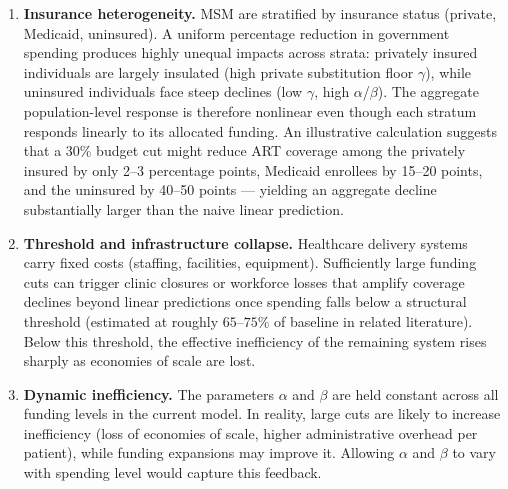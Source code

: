 \documentclass[preprint,12pt]{elsarticle}
\begin{document}
{\begin{enumerate}
    \item \textbf{Insurance heterogeneity.} MSM are stratified by insurance status
    (private, Medicaid, uninsured). A uniform percentage reduction in government
    spending produces highly unequal impacts across strata: privately insured
    individuals are largely insulated (high private substitution floor $\gamma$),
    while uninsured individuals face steep declines (low $\gamma$, high
    $\alpha$/$\beta$). The aggregate population-level response is therefore
    nonlinear even though each stratum responds linearly to its allocated funding.
    An illustrative calculation suggests that a 30\% budget cut might reduce ART
    coverage among the privately insured by only 2--3 percentage points, Medicaid
    enrollees by 15--20 points, and the uninsured by 40--50 points --- yielding an
    aggregate decline substantially larger than the naive linear prediction.

    \item \textbf{Threshold and infrastructure collapse.} Healthcare delivery systems
    carry fixed costs (staffing, facilities, equipment). Sufficiently large funding
    cuts can trigger clinic closures or workforce losses that amplify coverage
    declines beyond linear predictions once spending falls below a structural
    threshold (estimated at roughly $65$--$75\%$ of baseline in related
    literature). Below this threshold, the effective inefficiency of the remaining
    system rises sharply as economies of scale are lost.

    \item \textbf{Dynamic inefficiency.} The parameters $\alpha$ and $\beta$ are
    held constant across all funding levels in the current model. In reality,
    large cuts are likely to increase inefficiency (loss of economies of scale,
    higher administrative overhead per patient), while funding expansions may
    improve it. Allowing $\alpha$ and $\beta$ to vary with spending level would
    capture this feedback.
\end{enumerate}

}
\end{document}
